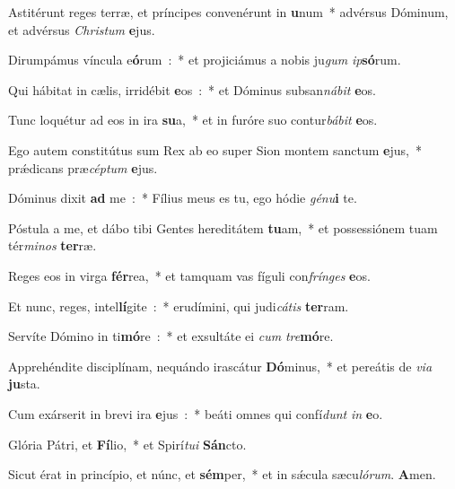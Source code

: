 \item Astitérunt reges terræ, et príncipes convenérunt in \textbf{u}num~* advérsus Dóminum, et advérsus \emph{Chri}\emph{stum} \textbf{e}jus.
\item Dirumpámus víncula e\textbf{ó}rum~:~* et projiciámus a nobis ju\emph{gum} \emph{ip}\textbf{só}rum.
\item Qui hábitat in cælis, irridébit \textbf{e}os~:~* et Dóminus subsan\emph{ná}\emph{bit} \textbf{e}os.
\item Tunc loquétur ad eos in ira \textbf{su}a,~* et in furóre suo contur\emph{bá}\emph{bit} \textbf{e}os.
\item Ego autem constitútus sum Rex ab eo super Sion montem sanctum \textbf{e}jus,~* prǽdicans præ\emph{cép}\emph{tum} \textbf{e}jus.
\item Dóminus dixit \textbf{ad} me~:~* Fílius meus es tu, ego hódie \emph{gé}\emph{nu}\textbf{i} te.
\item Póstula a me, et dábo tibi Gentes hereditátem \textbf{tu}am,~* et possessiónem tuam tér\emph{mi}\emph{nos} \textbf{ter}ræ.
\item Reges eos in virga \textbf{fér}rea,~* et tamquam vas fíguli con\emph{frín}\emph{ges} \textbf{e}os.
\item Et nunc, reges, intel\textbf{lí}gite~:~* erudímini, qui judi\emph{cá}\emph{tis} \textbf{ter}ram.
\item Servíte Dómino in ti\textbf{mó}re~:~* et exsultáte ei \emph{cum} \emph{tre}\textbf{mó}re.
\item Apprehéndite disciplínam, nequándo irascátur \textbf{Dó}minus,~* et pereátis de \emph{vi}\emph{a} \textbf{ju}sta.
\item Cum exárserit in brevi ira \textbf{e}jus~:~* beáti omnes qui confí\emph{dunt} \emph{in} \textbf{e}o.
\item Glória Pátri, et \textbf{Fí}lio,~* et Spirí\emph{tu}\emph{i} \textbf{Sán}cto.
\item Sicut érat in princípio, et núnc, et \textbf{sém}per,~* et in sǽcula sæcu\emph{ló}\emph{rum}. \textbf{A}men.

